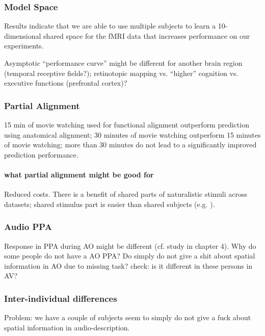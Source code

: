 \subsubsection{Model Space}
%
Results indicate that we are able to use multiple subjects to learn a
10-dimensional shared space for the fMRI data that increases performance on our
experiments.

%
Asymptotic ``performance curve'' might be different for another brain region
(temporal receptive fields?); retinotopic mapping vs. ``higher'' cognition  vs.
executive functions (prefrontal cortex)?


\subsubsection{Partial Alignment}
%
15 min of movie watching used for functional alignment outperform prediction
using anatomical alignment;
%
30 minutes of movie watching outperform 15 minutes of movie watching;
%
more than 30 minutes do not lead to a significantly improved prediction
performance.


\paragraph{what partial alignment might be good for}
%
Reduced costs.
%
There is a benefit of shared parts of naturalistic stimuli across datasets;
shared stimulus part is easier than shared subjects (e.g.
\citep{zhang2018transfer}).


\subsubsection{Audio PPA}

%
Response in PPA during AO might be different (cf. study in chapter 4).
%
Why do some people do not have a AO PPA? Do simply do not give a shit
about spatial information in AO due to missing task?
%
check: is it different in these persons in AV?


\subsubsection{Inter-individual differences}

%
Problem: we have a couple of subjects seem to simply do not give a fuck about
spatial information in audio-description.

